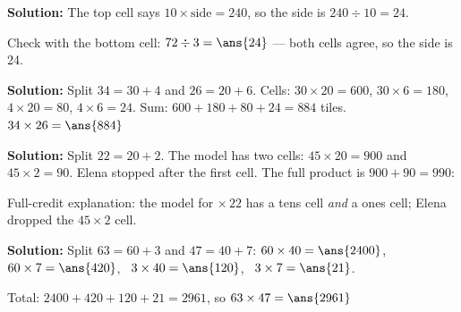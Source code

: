 \documentclass[12pt]{article}
\begin{document}

\textbf{Solution:} The top cell says $10 \times \text{side} = 240$, so the side
is $240 \div 10 = 24$. 

Check with the bottom cell: $72 \div 3 = \ans{24}$ --- both cells agree, so the
side is 24.


\textbf{Solution:} Split $34 = 30 + 4$ and $26 = 20 + 6$. Cells:
$30 \times 20 = 600$, $30 \times 6 = 180$, $4 \times 20 = 80$,
$4 \times 6 = 24$. Sum: $600 + 180 + 80 + 24 = 884$ tiles.
$34 \times 26 = \ans{884}$


\textbf{Solution:} Split $22 = 20 + 2$. The model has two cells:
$45 \times 20 = 900$ and $45 \times 2 = 90$. Elena stopped after the first
cell. The full product is $900 + 90 = 990$: 

Full-credit explanation: the model for $\times\,22$ has a tens cell
\emph{and} a ones cell; Elena dropped the $45 \times 2$ cell.


\textbf{Solution:} Split $63 = 60 + 3$ and $47 = 40 + 7$:
$60 \times 40 = \ans{2400}$, \ $60 \times 7 = \ans{420}$, \
$3 \times 40 = \ans{120}$, \ $3 \times 7 = \ans{21}$.

Total: $2400 + 420 + 120 + 21 = 2961$, so $63 \times 47 = \ans{2961}$
\end{document}
